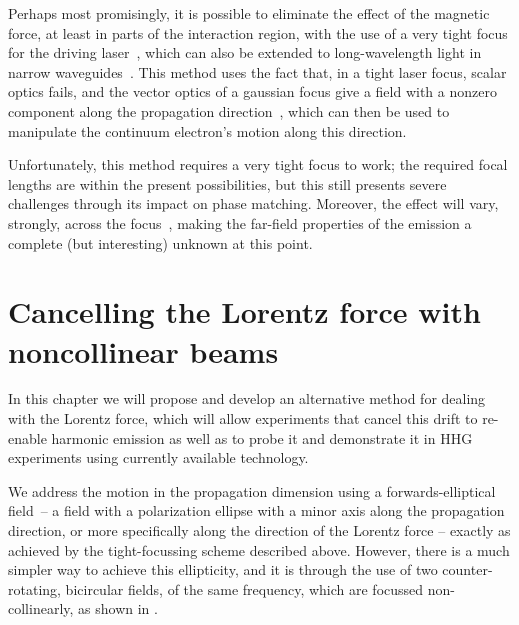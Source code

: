 Perhaps most promisingly, it is possible to eliminate the effect of the magnetic force, at least in parts of the interaction region, with the use of a very tight focus for the driving laser~\cite{liu_laser-guided_2009, lin_tight-focus_2006}, which can also be extended to long-wavelength light in narrow waveguides~\cite{galloway_lorentz_2016}. This method uses the fact that, in a tight laser focus, scalar optics fails, and the vector optics of a gaussian focus give a field with a nonzero component along the propagation direction~\cite{maltsev_nondipole-ati_2003}, which can then be used to manipulate the continuum electron's motion along this direction. 

Unfortunately, this method requires a very tight focus to work; the required focal lengths are within the present possibilities, but this still presents severe challenges through its impact on phase matching. Moreover, the effect will vary, strongly, across the focus~\cite{galloway_lorentz_2016}, making the far-field properties of the emission a complete (but interesting) unknown at this point.






\section{Cancelling the Lorentz force with noncollinear beams}
In this chapter we will propose and develop an alternative method for dealing with the Lorentz force, which will allow experiments that cancel this drift to re-enable harmonic emission as well as to probe it and demonstrate it in HHG experiments using currently available technology.

We address the motion in the propagation dimension using a forwards-elliptical field~-- a field with a polarization ellipse with a minor axis along the propagation direction, or more specifically along the direction of the Lorentz force -- exactly as achieved by the tight-focussing scheme described above. However, there is a much simpler way to achieve this ellipticity, and it is through the use of two counter-rotating, bicircular fields, of the same frequency, which are focussed non-collinearly, as shown in .


